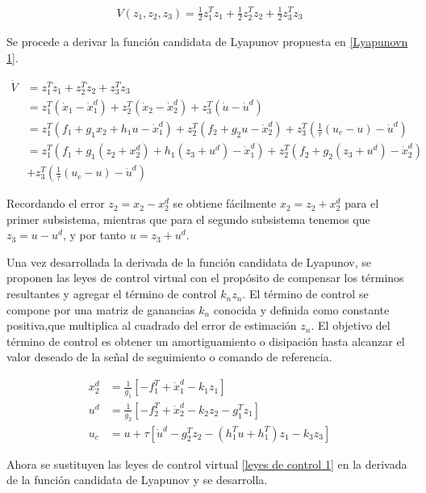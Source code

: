\begin{gather}
\label{Lyapunovn 1}
    V (z_1, z_2, z_3) =\frac{1}{2} z^T_1 z_1 + \frac{1}{2} z^T_2 z_2 + \frac{1}{2} z^T_3 z_3
\end{gather}

 Se procede a derivar la función candidata de Lyapunov propuesta en \ref{Lyapunovn 1}.

\begin{align}
       \dot V &= z^T_1 \dot z_1 + z^T_2 \dot z_2 + z^T_3 \dot z_3 \nonumber \\
        &= z^T_1 (\dot x_1 - \dot x^d_1) + z^T_2 (\dot x_2 - \dot x^d_2) + z^T_3 (\dot u - \dot u^d) \nonumber \\ 
    &= z^T_1 (f_1 + g_{1} x_2 + h_1 u - \dot x^d_1) + z^T_2 (f_2 + g_{2} u - \dot x^d_2) + z^T_3 (\frac{1}{\tau}(u_c - u) - \dot u^d) \nonumber \\
    &= z^T_1 (f_1 + g_{1} (z_2 + x_{2}^d) + h_1 (z_3 + u^d) - \dot x^d_1) + z^T_2 (f_2 + g_{2} (z_3 + u^d) - \dot x^d_2)\nonumber \\
    &+ z^T_3 (\frac{1}{\tau}(u_c - u) - \dot u^d)
\end{align}

Recordando el error $z_2 = x_2 - x^d_2$ se obtiene fácilmente $x_2 = z_2 + x^d_2$ para el primer subsistema, mientras que para el segundo subsistema tenemos que $z_3 = u - u^d$,  y por tanto $u = z_3 + u^d$. 

Una vez desarrollada la derivada de la función candidata de Lyapunov, se proponen las leyes de control virtual con el propósito de compensar los términos resultantes y agregar el término de control $k_n z_n$.
El término de control se compone por una matriz de ganancias $k_n$ conocida y definida como constante positiva,que multiplica al cuadrado del error de estimación $z_n$. El objetivo del término de control es obtener un amortiguamiento o disipación hasta alcanzar el valor deseado de la señal de seguimiento o comando de referencia. 

\begin{align}
\label{leyes de control 1}
    x^d_2 &= \frac{1}{g_{1}} [- f^T_1 + \dot x^d_1 - k_1 z_1] \nonumber \\
    u^d &= \frac{1}{g_{2}} [-f_{2}^T + \dot x_{2}^d - k_2 z_2 - g_{1}^T z_1] \nonumber \\
    u_c &= u + \tau [\dot u^d - g_{2}^T z_2 - (h_1^T u + h_{1}^T) z_1 - k_3 z_3]
\end{align}

Ahora se sustituyen las leyes de control virtual \ref{leyes de control 1} en la derivada de la función candidata de Lyapunov y se desarrolla.

